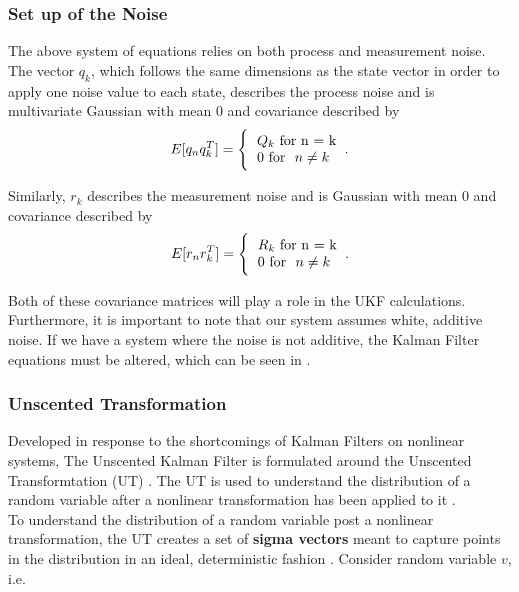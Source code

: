     \subsubsection{Set up of the Noise}
    The above system of equations relies on both process and measurement noise. The vector $q_k$, which follows the same dimensions as the state vector in order to apply one noise value to each state, describes the process noise and is multivariate Gaussian with mean 0 and covariance described by 
    \begin{equation}
    E[q_{n}q_{k}^T] = \Bigg\{\begin{tabular}{l}
    $Q_k$\ for\ n = k  \\
    0   for \ $n \neq k$
    \end{tabular}.
    \end{equation}
    
    Similarly, $r_k$ describes the measurement noise and is Gaussian with mean 0 and covariance described by 
    \begin{equation}
    E[r_{n}r_{k}^T] = \Bigg\{\begin{tabular}{l}
    $R_k$\ for\ n = k  \\
    0   for \ $n \neq k$
    \end{tabular}. 
    \end{equation}
    
    
    Both of these covariance matrices will play a role in the UKF calculations. Furthermore, it is important to note that our system assumes white, additive noise. If we have a system where the noise is not additive, the Kalman Filter equations must be altered, which can be seen in \cite{VanMereChapter}. 
    
    \subsubsection{Unscented Transformation}
    Developed in response to the shortcomings of Kalman Filters on nonlinear systems, The Unscented Kalman Filter is formulated around the Unscented Transformtation (UT) \cite{JulierPaper}. The UT is used to understand the distribution of a random variable after a nonlinear transformation has been applied to it \cite{JulierPaper}. 
    \\
    To understand the distribution of a random variable post a nonlinear transformation, the UT creates a set of \textbf{sigma vectors} meant to capture points in the distribution in an ideal, deterministic fashion \cite{JulierPaper} \cite{VanMereChapter}. Consider random variable $v$, i.e.
    

